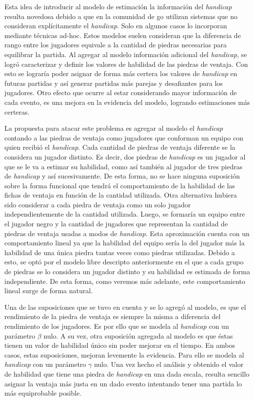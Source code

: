 \documentclass[11pt,twoside,spanish]{report} %
\begin{document}
Esta idea de introducir al modelo de estimaci\'on la informaci\'on del \textit{handicap} resulta novedosa debido a que en la comunidad de go utilizan sistemas que no consideran expl\'icitamente el \emph{handicap}.
Solo en algunos casos lo incorporan mediante t\'ecnicas ad-hoc.
Estos modelos suelen consideran que la diferencia de rango entre los jugadores equivale a la cantidad de piedras necesarias para equilibrar la partida.
Al agregar al modelo informaci\'on adicional del \textit{handicap}, se logr\'o caracterizar y definir los valores de habilidad de las piedras de ventaja.
Con esto se lograr\'ia poder asignar de forma m\'as certera los valores de \textit{handicap} en futuras partidas y as\'i generar partidas  m\'as parejas y desafiantes para los jugadores.
Otro efecto que ocurre al estar considerando mayor informaci\'on de cada evento, es una mejora en la evidencia del modelo, logrando estimaciones m\'as certeras.


La propuesta para atacar este problema es agregar al modelo el \textit{handicap} contando a las piedras de ventaja como jugadores que conforman un equipo con quien recibi\'o el \emph{handicap}.
Cada cantidad de piedras de ventaja diferente se la considera un jugador distinto.
Es decir, dos piedras de \textit{handicap} es un jugador al que se le va a estimar su habilidad, como as\'i tambi\'en al jugador de tres piedras de \textit{handicap} y as\'i sucesivamente.
De esta forma, no se hace ninguna suposici\'on sobre la forma funcional que tendr\'a el comportamiento de la habilidad de las fichas de ventaja en funci\'on de la cantidad utilizada.
Otra alternativa hubiera sido considerar a cada piedra de ventaja como un solo jugador independientemente de la cantidad utilizada. 
Luego, se formar\'ia un equipo entre el jugador negro y la cantidad de jugadores que representan la cantidad de piedras de ventaja usadas a modos de \textit{handicap}.
Esta aproximaci\'on cuenta con un comportamiento lineal ya que la habilidad del equipo ser\'ia la del jugador m\'as la habilidad de una \'unica piedra tantas veces como piedras utilizadas.
Debido a esto, se opt\'o por el modelo libre descripto anteriormente en el que a cada grupo de piedras se lo considera un jugador distinto y su habilidad es estimada de forma independiente.
De esta forma, como veremos m\'as adelante, este comportamiento lineal surge de forma natural.


Una de las suposiciones que se tuvo en cuenta y se lo agreg\'o al modelo, es que el rendimiento de la piedra de ventaja es siempre la misma a diferencia del rendimiento de los jugadores.
Es por ello que se modela al \textit{handicap} con un par\'ametro $\beta$ nulo.
A su vez, otra suposici\'on agregada al modelo es que \'estas tienen un valor de habilidad \'unico sin poder mejorar en el tiempo.
En ambos casos, estas suposiciones, mejoran levemente la evidencia.
Para ello se  modela al \textit{handicap} con un par\'ametro $\gamma$ nulo.
Una vez hecho el an\'alisis y obtenido el valor de habilidad que tiene una piedra de \textit{handicap} en una dada escala, resulta sencillo asignar la ventaja m\'as justa en un dado evento intentando tener una partida  lo m\'as equiprobable posible.
\end{document}
